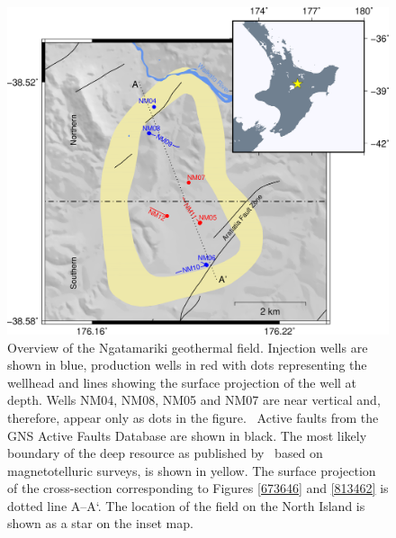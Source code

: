 \begin{figure}[h!]
\begin{center}
\includegraphics[width=0.70\columnwidth]{Chapter_1_Intro/figures/merc_Nga_overview_temps-wells_12-15_no_inset/merc_Nga_overview_wells_12-15}
\caption[Overview of the Ngatamariki geothermal field]{{
Overview of the Ngatamariki geothermal field. Injection wells are shown
in blue, production wells in red with dots representing the wellhead and
lines showing the surface projection of the well at depth. Wells NM04,
NM08, NM05 and NM07 are near vertical and, therefore, appear only as
dots in the figure.~ Active faults from the GNS Active Faults
Database \citep{AFDB} are shown in black. The most likely boundary
of the deep resource as published by~\protect\citet{Boseley_2010} based on
magnetotelluric surveys, is shown in yellow. The surface projection of the cross-section corresponding to Figures \ref{673646} and \ref{813462} is dotted line A--A`. The location of the field on the North Island is shown as a star on the inset map.
{\label{425195}}%
}}
\end{center}
\end{figure}


